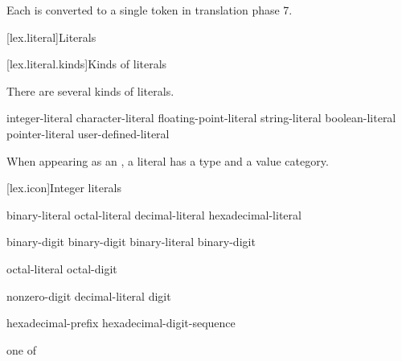 \documentclass{wg21}
\begin{document}
Each  is converted to a single token
in translation phase 7.%
%

[lex.literal]{Literals}%

[lex.literal.kinds]{Kinds of literals}

\pnum
{}%
%
There are several kinds of literals.

\begin{bnf}
    \br
    integer-literal\br
    character-literal\br
    floating-point-literal\br
    string-literal\br
    boolean-literal\br
    pointer-literal\br
    user-defined-literal
\end{bnf}
\begin{note}
    When appearing as an ,
    a literal has a type and a value category.
\end{note}

[lex.icon]{Integer literals}

%
\begin{bnf}
    \br
    binary-literal \br
    octal-literal \br
    decimal-literal \br
    hexadecimal-literal 
\end{bnf}

\begin{bnf}
    \br
     binary-digit\br
     binary-digit\br
    binary-literal  binary-digit
\end{bnf}

\begin{bnf}
    \br
    \br
    octal-literal  octal-digit
\end{bnf}

\begin{bnf}
    \br
    nonzero-digit\br
    decimal-literal  digit
\end{bnf}

\begin{bnf}
    \br
    hexadecimal-prefix hexadecimal-digit-sequence
\end{bnf}

\begin{bnf}
     \textnormal{one of}\br
\end{bnf}
\end{document}
